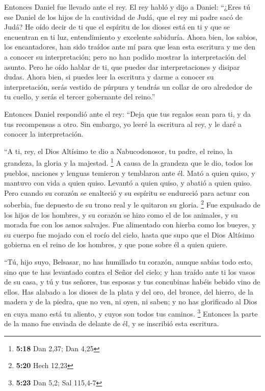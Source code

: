  Entonces Daniel fue llevado ante el rey. El rey habló y
dijo a Daniel: ``¿Eres tú ese Daniel de los hijos de la cautividad de
Judá, que el rey mi padre sacó de Judá?  He oído decir de
ti que el espíritu de los dioses está en ti y que se encuentran en ti
luz, entendimiento y excelente sabiduría.  Ahora bien,
los sabios, los encantadores, han sido traídos ante mí para que lean
esta escritura y me den a conocer su interpretación; pero no han podido
mostrar la interpretación del asunto.  Pero he oído
hablar de ti, que puedes dar interpretaciones y disipar dudas. Ahora
bien, si puedes leer la escritura y darme a conocer su interpretación,
serás vestido de púrpura y tendrás un collar de oro alrededor de tu
cuello, y serás el tercer gobernante del reino.''

 Entonces Daniel respondió ante el rey: ``Deja que tus
regalos sean para ti, y da tus recompensas a otro. Sin embargo, yo leeré
la escritura al rey, y le daré a conocer la interpretación.

 ``A ti, rey, el Dios Altísimo te dio a Nabucodonosor, tu
padre, el reino, la grandeza, la gloria y la majestad. \footnote{\textbf{5:18}
  Dan 2,37; Dan 4,25}  A causa de la grandeza que le dio,
todos los pueblos, naciones y lenguas temieron y temblaron ante él. Mató
a quien quiso, y mantuvo con vida a quien quiso. Levantó a quien quiso,
y abatió a quien quiso.  Pero cuando su corazón se
enalteció y su espíritu se endureció para actuar con soberbia, fue
depuesto de su trono real y le quitaron su gloria. \footnote{\textbf{5:20}
  Hech 12,23}  Fue expulsado de los hijos de los hombres,
y su corazón se hizo como el de los animales, y su morada fue con los
asnos salvajes. Fue alimentado con hierba como los bueyes, y su cuerpo
fue mojado con el rocío del cielo, hasta que supo que el Dios Altísimo
gobierna en el reino de los hombres, y que pone sobre él a quien quiere.

 ``Tú, hijo suyo, Belsasar, no has humillado tu corazón,
aunque sabías todo esto,  sino que te has levantado
contra el Señor del cielo; y han traído ante ti los vasos de su casa, y
tú y tus señores, tus esposas y tus concubinas habéis bebido vino de
ellos. Has alabado a los dioses de la plata y del oro, del bronce, del
hierro, de la madera y de la piedra, que no ven, ni oyen, ni saben; y no
has glorificado al Dios en cuya mano está tu aliento, y cuyos son todos
tus caminos. \footnote{\textbf{5:23} Dan 5,2; Sal 115,4-7}
 Entonces la parte de la mano fue enviada de delante de
él, y se inscribió esta escritura.

